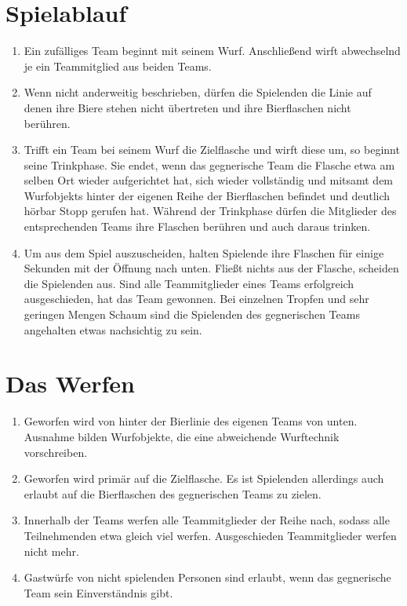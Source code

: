 \section{Spielablauf}
\begin{enumerate}[label={(\arabic*)}]    
    \item
    Ein zufälliges Team beginnt mit seinem Wurf.
    Anschließend wirft abwechselnd je ein Teammitglied aus beiden Teams.

    \item
    Wenn nicht anderweitig beschrieben, dürfen die Spielenden die Linie auf denen ihre Biere stehen nicht übertreten und ihre Bierflaschen nicht berühren.

    \item
    Trifft ein Team bei seinem Wurf die Zielflasche und wirft diese um, so beginnt seine Trinkphase.
    Sie endet, wenn das gegnerische Team die Flasche etwa am selben Ort wieder aufgerichtet hat, sich wieder vollständig und mitsamt dem Wurfobjekts hinter der eigenen Reihe der Bierflaschen befindet und deutlich hörbar \glqq{} Stopp\grqq{} gerufen hat.
    Während der Trinkphase dürfen die Mitglieder des entsprechenden Teams ihre Flaschen berühren und auch daraus trinken.

    \item
    Um aus dem Spiel auszuscheiden, halten Spielende ihre Flaschen für einige Sekunden mit der Öffnung nach unten.
    Fließt nichts aus der Flasche, scheiden die Spielenden aus.
    Sind alle Teammitglieder eines Teams erfolgreich ausgeschieden, hat das Team gewonnen.
    Bei einzelnen Tropfen und sehr geringen Mengen Schaum sind die Spielenden des gegnerischen Teams angehalten etwas nachsichtig zu sein.
\end{enumerate}

\section{Das Werfen}
\begin{enumerate}[label={(\arabic*)}]
    \item
    Geworfen wird von hinter der Bierlinie des eigenen Teams von unten.
    Ausnahme bilden Wurfobjekte, die eine abweichende Wurftechnik vorschreiben.

    \item
    Geworfen wird primär auf die Zielflasche.
    Es ist Spielenden allerdings auch erlaubt auf die Bierflaschen des gegnerischen Teams zu zielen.

    \item
    Innerhalb der Teams werfen alle Teammitglieder der Reihe nach, sodass alle Teilnehmenden etwa gleich viel werfen.
    Ausgeschieden Teammitglieder werfen nicht mehr.

    \item
    Gastwürfe von nicht spielenden Personen sind erlaubt, wenn das gegnerische Team sein Einverständnis gibt.
\end{enumerate}

